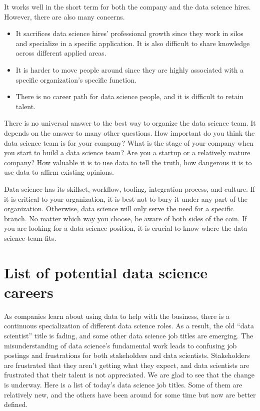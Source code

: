 \documentclass[12pt,]{krantz}
\providecommand{\tightlist}{%
  \setlength{\itemsep}{0pt}\setlength{\parskip}{0pt}}
\begin{document}
It works well in the short term for both the company and the data science hires. However, there are also many concerns.

\begin{itemize}
\tightlist
\item
  It sacrifices data science hires' professional growth since they work in silos and specialize in a specific application. It is also difficult to share knowledge across different applied areas.
\item
  It is harder to move people around since they are highly associated with a specific organization's specific function.
\item
  There is no career path for data science people, and it is difficult to retain talent.
\end{itemize}

There is no universal answer to the best way to organize the data science team. It depends on the answer to many other questions. How important do you think the data science team is for your company? What is the stage of your company when you start to build a data science team? Are you a startup or a relatively mature company? How valuable it is to use data to tell the truth, how dangerous it is to use data to affirm existing opinions.

Data science has its skillset, workflow, tooling, integration process, and culture. If it is critical to your organization, it is best not to bury it under any part of the organization. Otherwise, data science will only serve the need for a specific branch. No matter which way you choose, be aware of both sides of the coin. If you are looking for a data science position, it is crucial to know where the data science team fits.

\hypertarget{list-of-potential-data-science-careers}{%
\section{List of potential data science careers}\label{list-of-potential-data-science-careers}}

As companies learn about using data to help with the business, there is a continuous specialization of different data science roles.
As a result, the old ``data scientist'' title is fading, and some other data science job titles are emerging. The misunderstanding of data science's fundamental work leads to confusing job postings and frustrations for both stakeholders and data scientists. Stakeholders are frustrated that they aren't getting what they expect, and data scientists are frustrated that their talent is not appreciated. We are glad to see that the change is underway. Here is a list of today's data science job titles. Some of them are relatively new, and the others have been around for some time but now are better defined.
\end{document}
